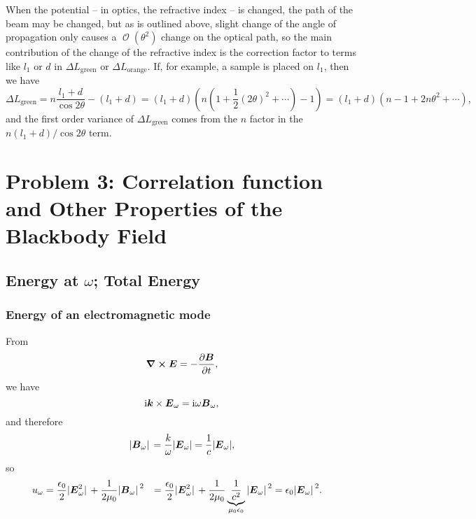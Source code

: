 \documentclass[hyperref, a4paper]{article}
\newcommand*{\ii}{\mathrm{i}}
\DeclareMathOperator{\bigO}{\mathcal{O}}
\def\\{}%
\begin{document}
When the potential -- in optics, the refractive index -- is changed, 
the path of the beam may be changed, 
but as is outlined above, slight change of the angle of propagation 
only causes a $\bigO(\theta^2)$ change on the optical path, 
so the main contribution of the change of the refractive index 
is the correction factor to terms like $l_1$ or $d$ in 
$\Delta L_{\text{green}}$ or $\Delta L_{\text{orange}}$.
If, for example, a sample is placed on $l_1$, 
then we have 
\begin{equation}
    \Delta L_{\text{green}} = n \frac{l_1 + d}{\cos 2 \theta} - (l_1 + d)
    = (l_1 + d) \left(
        n \left( 1 + \frac{1}{2} (2 \theta)^2 + \cdots \right) - 1 
    \right) 
    = (l_1 + d) (n - 1 + 2 n \theta^2 + \cdots),
\end{equation}
and the first order variance of $\Delta L_{\text{green}}$ comes from the $n$ factor in the 
$n (l_1 + d) / \cos 2 \theta$ term. 

\section{Problem 3: Correlation function and Other Properties of the Blackbody Field}

\subsection{Energy at $\omega$; Total Energy}

\subsubsection{Energy of an electromagnetic mode}\label{sec:correlation.energy.mode}

From 
\[
    \curl{\vb*{E}} = - \pdv{\vb*{B}}{t},
\]
we have 
\[
    \ii \vb*{k} \times \vb*{E}_\omega = \ii \omega \vb*{B}_\omega,
\]
and therefore 
\[
    \abs*{\vb*{B}_\omega} = \frac{k}{\omega} \abs{\vb*{E}_\omega} = \frac{1}{c} \abs{\vb*{E}_\omega},
\]
so 
\begin{equation}
    \begin{aligned}
        u_\omega &= \frac{\epsilon_0}{2} \abs*{\vb*{E}_\omega^2 }
        + \frac{1}{2 \mu_0} \abs*{\vb*{B}_\omega}^2 \\
        &= \frac{\epsilon_0}{2} \abs*{\vb*{E}_\omega^2} 
        + \frac{1}{2 \mu_0} \underbrace{\frac{1}{c^2}}_{\mu_0 \epsilon_0} \abs*{\vb*{E}_\omega}^2  \\
        &= \epsilon_0 \abs*{\vb*{E}_\omega}^2.
    \end{aligned}
\end{equation}
\end{document}
